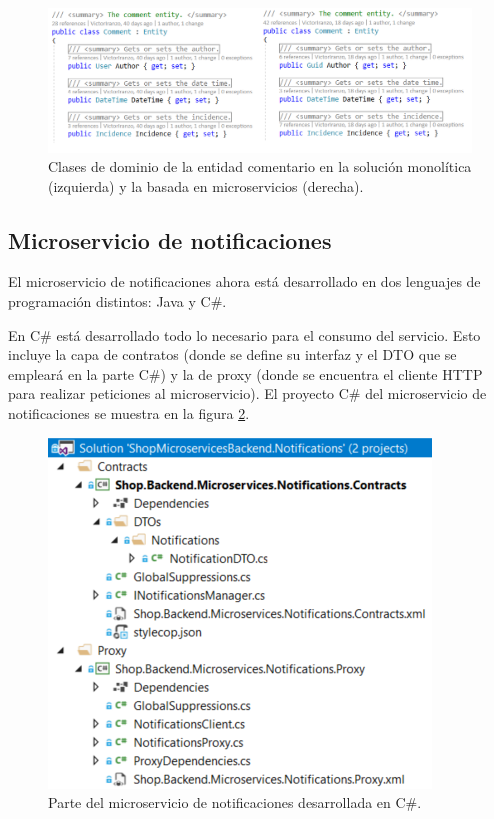 \documentclass[11pt,spanish,listoffigures]{tfgetsinf}
\begin{document}
\begin{figure}[h]
\centering
\includegraphics[scale=0.7]{Comment}
\caption{Clases de dominio de la entidad comentario en la solución monolítica (izquierda) y la basada en microservicios (derecha).}
\label{fig:Comment}
\end{figure}

\subsection{Microservicio de notificaciones}

El microservicio de notificaciones ahora está desarrollado en dos lenguajes de programación distintos: Java y C\#.

En C\# está desarrollado todo lo necesario para el consumo del servicio. Esto incluye la capa de contratos (donde se define su interfaz y el DTO que se empleará en la parte C\#) y la de proxy (donde se encuentra el cliente HTTP para realizar peticiones al microservicio). El proyecto C\# del microservicio de notificaciones se muestra en la figura \ref{fig:NotificationsC}.

\begin{figure}[h]
\centering
\includegraphics[scale=0.85]{NotificationsC}
\caption{Parte del microservicio de notificaciones desarrollada en C\#.}
\label{fig:NotificationsC}
\end{figure}
\end{document}
